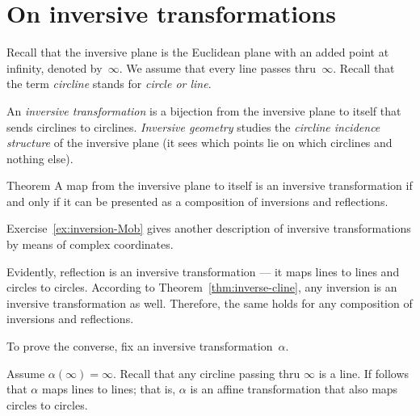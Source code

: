 


\section{On inversive transformations}

Recall that the inversive plane is the Euclidean plane with an added point at infinity, denoted by~$\infty$.
We assume that every line passes thru~$\infty$.
Recall that the term {}\emph{circline} stands for {}\emph{circle or line}.

An \emph{inversive transformation} is a bijection from the inversive plane to itself that sends circlines to circlines.
\emph{Inversive geometry} studies the {}\emph{circline incidence structure} of the inversive plane
(it sees which points lie on which circlines and nothing else).

\begin{thm}{Theorem}\label{thm:inversions-inversive}
A map from the inversive plane to itself is an inversive transformation
if and only if it can be presented as a composition of inversions and reflections.  
\end{thm}

Exercise~\ref{ex:inversion-Mob} gives another description of inversive transformations by means of complex coordinates.

Evidently, reflection is an inversive transformation --- it maps lines to lines and circles to circles.
According to Theorem~\ref{thm:inverse-cline}, any inversion is an inversive transformation as well.
Therefore, the same holds for any composition of inversions and reflections.

To prove the converse, 
fix an inversive transformation~$\alpha$.

Assume $\alpha(\infty)=\infty$.
Recall that any circline passing thru $\infty$ is a line.
If follows that $\alpha$ maps lines to lines;
that is,
$\alpha$ is an affine transformation that also maps circles to circles.

